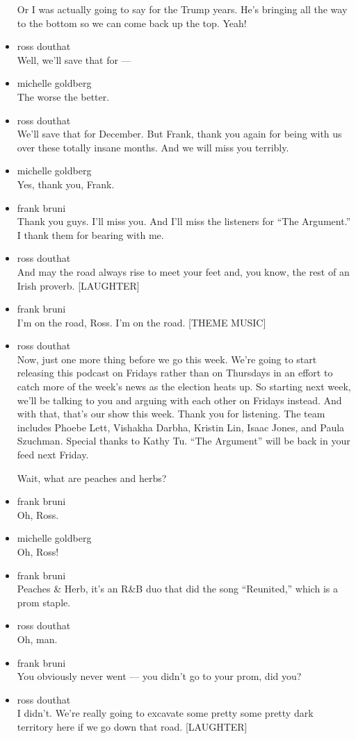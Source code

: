 \begin{itemize}
  Or I was actually going to say for the Trump years. He's bringing all
  the way to the bottom so we can come back up the top. Yeah!
\item
  ross douthat\\
  Well, we'll save that for ---
\item
  michelle goldberg\\
  The worse the better.
\item
  ross douthat\\
  We'll save that for December. But Frank, thank you again for being
  with us over these totally insane months. And we will miss you
  terribly.
\item
  michelle goldberg\\
  Yes, thank you, Frank.
\item
  frank bruni\\
  Thank you guys. I'll miss you. And I'll miss the listeners for ``The
  Argument.'' I thank them for bearing with me.
\item
  ross douthat\\
  And may the road always rise to meet your feet and, you know, the rest
  of an Irish proverb. {[}LAUGHTER{]}
\item
  frank bruni\\
  I'm on the road, Ross. I'm on the road. {[}THEME MUSIC{]}
\item
  ross douthat\\
  Now, just one more thing before we go this week. We're going to start
  releasing this podcast on Fridays rather than on Thursdays in an
  effort to catch more of the week's news as the election heats up. So
  starting next week, we'll be talking to you and arguing with each
  other on Fridays instead. And with that, that's our show this week.
  Thank you for listening. The team includes Phoebe Lett, Vishakha
  Darbha, Kristin Lin, Isaac Jones, and Paula Szuchman. Special thanks
  to Kathy Tu. ``The Argument'' will be back in your feed next Friday.

  Wait, what are peaches and herbs?
\item
  frank bruni\\
  Oh, Ross.
\item
  michelle goldberg\\
  Oh, Ross!
\item
  frank bruni\\
  Peaches \& Herb, it's an R\&B duo that did the song ``Reunited,''
  which is a prom staple.
\item
  ross douthat\\
  Oh, man.
\item
  frank bruni\\
  You obviously never went --- you didn't go to your prom, did you?
\item
  ross douthat\\
  I didn't. We're really going to excavate some pretty some pretty dark
  territory here if we go down that road. {[}LAUGHTER{]}
\end{itemize}


